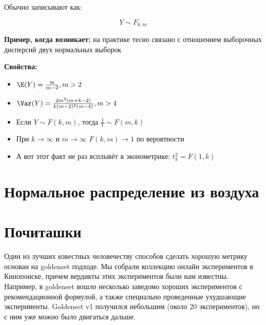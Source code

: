 Обычно записывают как:

$$
Y \sim F_{k,m}
$$   

\textbf{Пример, когда возникает:} на практике тесно связано с отношением выборочных дисперсий двух нормальных выборок

\textbf{Свойства:}

\begin{itemize} 
\item $\E(Y) = \frac{m}{m-2}, m > 2$
\item $\Var(Y) = \frac{2m^2(m + k - 2)}{k (m - 2)^2 (m - 4) }, m > 4$
\item Если $Y \sim F(k,m)$, тогда $\frac{1}{Y} \sim F(m,k)$
\item При $k \to \infty$ и $m \to \infty$ $F(k,m) \to 1$ по вероятности
\item А вот этот факт не раз всплывёт в эконометрике: $t_k^2 = F(1,k)$
\end{itemize} 


\section{Нормальное распределение из воздуха}


\section*{Почиташки} 




Один из лучших известных человечеству способов сделать хорошую метрику основан на goldenset подходе. Мы собрали коллекцию онлайн экспериментов в Кинопоиске, причем вердикты этих экспериментов были нам известны. Например, в goldenset вошло несколько заведомо хороших экспериментов с рекомендационной формулой, а также специально проведенные ухудшающие эксперименты. Goldenset v1 получился небольшим (около 20 экспериментов), но с ним уже можно было двигаться дальше.
